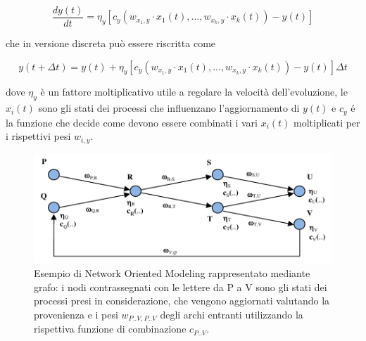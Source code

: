 \begin{equation*}
    \frac{dy(t)}{dt} = \eta_{y}[c_{y}(w_{x_1,y} \cdot x_1(t),...,w_{x_k,y} \cdot x_k(t)) - y(t)]
\end{equation*}

che in versione discreta può essere riscritta come

\begin{equation*}
    y(t + \Delta t) = y(t) + \eta_{y}[c_{y}(w_{x_1,y} \cdot x_1(t),...,w_{x_k,y} \cdot x_k(t)) - y(t)]\Delta t
\end{equation*}

dove $\eta_{y}$ è un fattore moltiplicativo utile a regolare la velocità dell'evoluzione, le $x_i(t)$ sono gli stati dei processi che influenzano l'aggiornamento di $y(t)$ e $c_{y}$ é la funzione che decide come devono essere combinati i vari $x_i(t)$ moltiplicati per i rispettivi pesi $w_{i,y}$.

\begin{figure}[ht]
  \includegraphics[width=\linewidth]{immagini/network-oriented-modeling.png}
  \caption{Esempio di Network Oriented Modeling rappresentato mediante grafo: i nodi contrassegnati con le lettere da P a V sono gli stati dei processi presi in considerazione, che vengono aggiornati valutando la provenienza e i pesi $w_{P..V,P..V}$ degli archi entranti utilizzando la rispettiva funzione di combinazione $c_{P..V}$.}

  \label{fig:net-model}
\end{figure}

